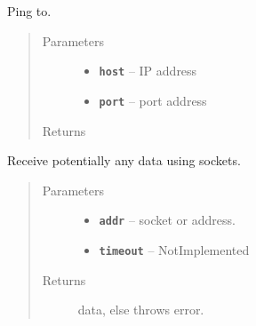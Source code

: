 \documentclass[letterpaper,10pt,english]{sphinxmanual}
\begin{document}

\begin{fulllineitems}
\label{RRtoolbox.lib:RRtoolbox.lib.serverServices.parseString}
\end{fulllineitems}


\begin{fulllineitems}
\label{RRtoolbox.lib:RRtoolbox.lib.serverServices.ping}
Ping to.
\begin{quote}\begin{description}
\item[{Parameters}] \leavevmode\begin{itemize}
\item {} 
\textbf{\texttt{host}} -- IP address

\item {} 
\textbf{\texttt{port}} -- port address

\end{itemize}

\item[{Returns}] \leavevmode


\end{description}\end{quote}

\end{fulllineitems}


\begin{fulllineitems}
\label{RRtoolbox.lib:RRtoolbox.lib.serverServices.rcvPickle}
Receive potentially any data using sockets.
\begin{quote}\begin{description}
\item[{Parameters}] \leavevmode\begin{itemize}
\item {} 
\textbf{\texttt{addr}} -- socket or address.

\item {} 
\textbf{\texttt{timeout}} -- NotImplemented

\end{itemize}

\item[{Returns}] \leavevmode
data, else throws error.

\end{description}\end{quote}

\end{fulllineitems}
\end{document}
